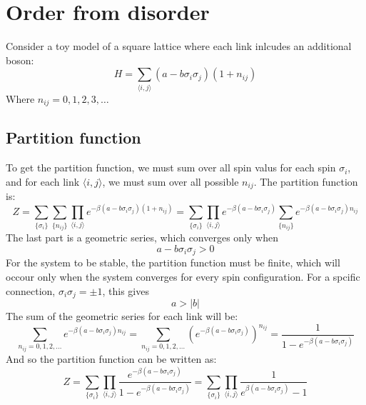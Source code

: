 \documentclass{article}
\begin{document}
\section{Order from disorder}
Consider a toy model of a square lattice where each link inlcudes an additional boson:
\begin{equation}
    H = \sum_{\langle i, j \rangle} (a - b\sigma_i\sigma_j) (1 + n_{ij})
\end{equation}
Where $n_{ij} = 0,1,2,3,\dots$
\subsection{Partition function}
To get the partition function, we must sum over all spin valus for each spin $\sigma_i$, and for each link $\langle i,j \rangle$, we must sum over all possible $n_{ij}$. The partition function is:
\begin{equation}
    Z = \sum_{\{\sigma_i\}}\sum_{\{n_{ij}\}}\prod_{\langle i,j \rangle}e^{-\beta\left(a - b\sigma_i\sigma_j\right)\left(1 + n_{ij}\right)} = \sum_{\{\sigma_i\}}\prod_{\langle i,j \rangle}e^{-\beta\left(a - b\sigma_i\sigma_j\right)}\sum_{\{n_{ij}\}}e^{-\beta\left(a - b\sigma_i\sigma_j\right)n_{ij}}
\end{equation}
The last part is a geometric series, which converges only when
\begin{equation}
    a-b\sigma_i\sigma_j > 0
\end{equation}
For the system to be stable, the partition function must be finite, which will occour only when the system converges for every spin configuration. For a spcific connection, $\sigma_i\sigma_j=\pm1$, this gives
\begin{equation}
    a > |b|
\end{equation}
The sum of the geometric series for each link will be:
\begin{equation}
\label{eq:sum}
    \sum_{n_{ij}=0,1,2,\dots}e^{-\beta\left(a - b\sigma_i\sigma_j\right)n_{ij}} = 
    \sum_{n_{ij}=0,1,2,\dots}\left(e^{-\beta\left(a - b\sigma_i\sigma_j\right)}\right)^{n_{ij}} = 
    \frac{1}{1-e^{-\beta\left(a - b\sigma_i\sigma_j\right)}}
\end{equation}
And so the partition function can be written as:
\begin{equation}
    Z = \sum_{\{\sigma_i\}}\prod_{\langle i,j \rangle}\frac{e^{-\beta\left(a - b\sigma_i\sigma_j\right)}}{1-e^{-\beta\left(a - b\sigma_i\sigma_j\right)}} = \sum_{\{\sigma_i\}}\prod_{\langle i,j \rangle}\frac{1}{e^{\beta\left(a - b\sigma_i\sigma_j\right)}-1}
\end{equation}
\end{document}

